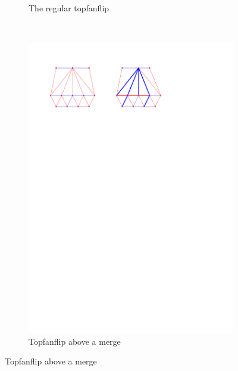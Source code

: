 \begin{figure}
\begin{subfigure}[b]{0.8 \textwidth}
        \caption{The regular topfanflip}
        \label{fig:fanflip:regular}
    \end{subfigure}
    ~
    \centering
    \begin{subfigure}[b]{0.45 \textwidth}
        \includegraphics[width = \textwidth]{topFanFlips/img/merge}
        \caption{Topfanflip above a merge}
        \label{fig:fanflip:merge}


\end{subfigure}
\end{figure}
